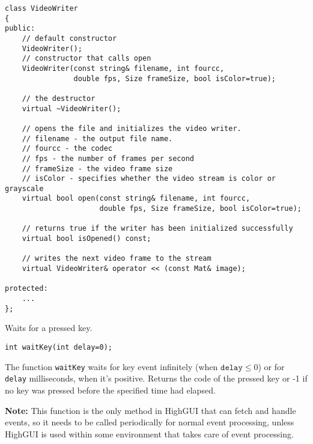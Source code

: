 \begin{lstlisting}
class VideoWriter
{
public:    
    // default constructor
    VideoWriter();
    // constructor that calls open
    VideoWriter(const string& filename, int fourcc,
                double fps, Size frameSize, bool isColor=true);
    
    // the destructor
    virtual ~VideoWriter();
    
    // opens the file and initializes the video writer.
    // filename - the output file name. 
    // fourcc - the codec
    // fps - the number of frames per second
    // frameSize - the video frame size
    // isColor - specifies whether the video stream is color or grayscale
    virtual bool open(const string& filename, int fourcc,
                      double fps, Size frameSize, bool isColor=true);
    
    // returns true if the writer has been initialized successfully
    virtual bool isOpened() const;
    
    // writes the next video frame to the stream
    virtual VideoWriter& operator << (const Mat& image);
    
protected:
    ...
};
\end{lstlisting}

\label{waitKey}
Waits for a pressed key.

\begin{lstlisting}
int waitKey(int delay=0);
\end{lstlisting}
\begin{description}
\end{description}

The function \texttt{waitKey} waits for key event infinitely (when $\texttt{delay}\leq 0$) or for \texttt{delay} milliseconds, when it's positive. Returns the code of the pressed key or -1 if no key was pressed before the specified time had elapsed.

\textbf{Note:} This function is the only method in HighGUI that can fetch and handle events, so it needs to be called periodically for normal event processing, unless HighGUI is used within some environment that takes care of event processing.

